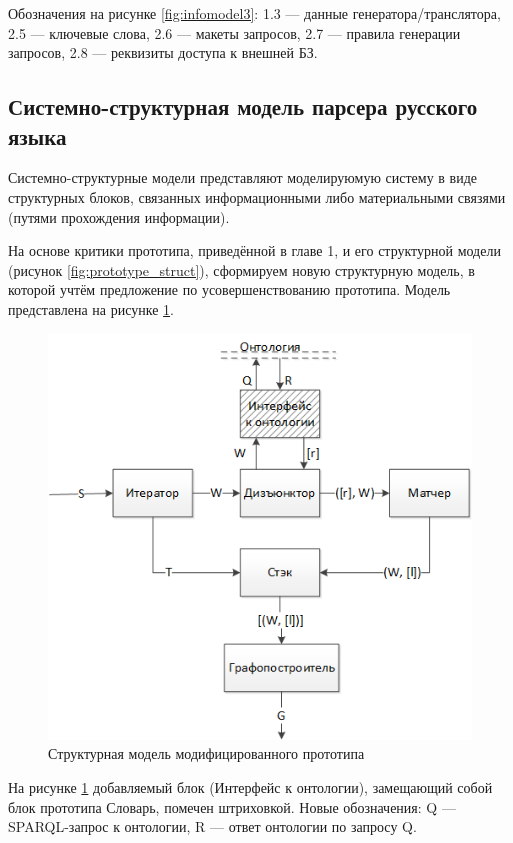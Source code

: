 Обозначения на рисунке \ref{fig:infomodel3}: 1.3 --- данные генератора/транслятора, 2.5 --- ключевые слова, 2.6 --- макеты запросов, 2.7 --- правила генерации запросов, 2.8 --- реквизиты доступа к внешней БЗ.

\subsection{Системно-структурная модель парсера русского языка}

Системно-структурные модели представляют моделируюмую систему в виде структурных блоков, связанных информационными либо материальными связями (путями прохождения информации).

На основе критики прототипа, приведённой в главе 1, и его структурной модели (рисунок \ref{fig:prototype_struct}), сформируем новую структурную модель, в которой учтём предложение по усовершенствованию прототипа. Модель представлена на рисунке \ref{fig:modifiedstruct}.

\begin{figure}[H]
	\centering
		\includegraphics[scale=1.0]{images/modifiedstructure.png}
	\caption{\small Структурная модель модифицированного прототипа}
	\label{fig:modifiedstruct}
\end{figure}

На рисунке \ref{fig:modifiedstruct} добавляемый блок (Интерфейс к онтологии), замещающий собой блок прототипа Словарь, помечен штриховкой. Новые обозначения: Q --- SPARQL-запрос к онтологии, R --- ответ онтологии по запросу Q.

